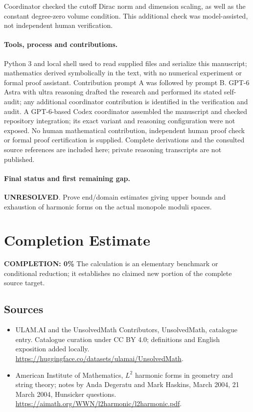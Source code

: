\documentclass[11pt]{article}
\begin{document}
Coordinator checked the cutoff Dirac norm and dimension scaling, as well as the constant degree-zero volume condition. This additional check was model-assisted, not independent human verification.

\paragraph{Tools, process and contributions.}
Python 3 and local shell used to read supplied files and serialize this manuscript; mathematics derived symbolically in the text, with no numerical experiment or formal proof assistant. Contribution prompt A was followed by prompt B. GPT-6 Astra with ultra reasoning drafted the research and performed its stated self-audit; any additional coordinator contribution is identified in the verification and audit. A GPT-6-based Codex coordinator assembled the manuscript and checked repository integration; its exact variant and reasoning configuration were not exposed. No human mathematical contribution, independent human proof check or formal proof certification is supplied. Complete derivations and the consulted source references are included here; private reasoning transcripts are not published.

\paragraph{Final status and first remaining gap.}
\textbf{UNRESOLVED}. Prove end/domain estimates giving upper bounds and exhaustion of harmonic forms on the actual monopole moduli spaces.

\section{Completion Estimate}
\noindent\textbf{COMPLETION: 0\%}
The calculation is an elementary benchmark or conditional reduction; it establishes no claimed new portion of the complete source target.

\subsection{Sources}
\begin{itemize}
\item[\hypertarget{source:statement:1}{S1}] ULAM.AI and the UnsolvedMath Contributors, UnsolvedMath, catalogue entry. Catalogue curation under CC BY 4.0; definitions and English exposition added locally.
\url{https://huggingface.co/datasets/ulamai/UnsolvedMath}.
\item[\hypertarget{source:statement:2}{S2}] American Institute of Mathematics, $L^2$ harmonic forms in geometry and string theory; notes by Anda Degeratu and Mark Haskins, March 2004, 21 March 2004, Hunsicker questions.
\url{https://aimath.org/WWN/l2harmonic/l2harmonic.pdf}.
\end{itemize}
\label{end:statement}
\end{document}
